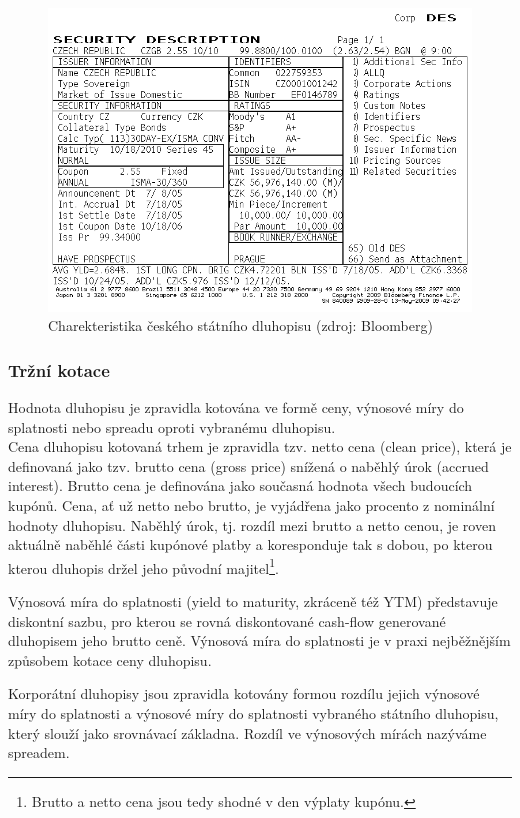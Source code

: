 \documentclass[a4paper]{book}
\begin{document}
\begin{figure}
  \includegraphics[bb=0 0 350 250]{czgb.bmp}
  \caption{Charekteristika českého státního dluhopisu (zdroj: Bloomberg)}
  \label{czgb}
\end{figure}

\subsubsection{Tržní kotace}

Hodnota dluhopisu je zpravidla kotována ve formě ceny, výnosové míry do splatnosti nebo spreadu oproti vybranému dluhopisu.\\

Cena dluhopisu kotovaná trhem je zpravidla tzv. netto cena (clean price), která je definovaná jako tzv. brutto cena (gross price) snížená o naběhlý úrok (accrued interest). Brutto cena je definována jako současná hodnota všech budoucích kupónů. Cena, ať už netto nebo brutto, je vyjádřena jako procento z nominální hodnoty dluhopisu. Naběhlý úrok, tj. rozdíl mezi brutto a netto cenou, je roven aktuálně naběhlé části kupónové platby a koresponduje tak s dobou, po kterou kterou dluhopis držel jeho původní majitel\footnote{Brutto a netto cena jsou tedy shodné v den výplaty kupónu.}.

Výnosová míra do splatnosti (yield to maturity, zkráceně též YTM) představuje diskontní sazbu, pro kterou se rovná diskontované cash-flow generované dluhopisem jeho brutto ceně. Výnosová míra do splatnosti je v praxi nejběžnějším způsobem kotace ceny dluhopisu.

Korporátní dluhopisy jsou zpravidla kotovány formou rozdílu jejich výnosové míry do splatnosti a výnosové míry do splatnosti vybraného státního dluhopisu, který slouží jako srovnávací základna. Rozdíl ve výnosových mírách nazýváme spreadem.\\
\end{document}
